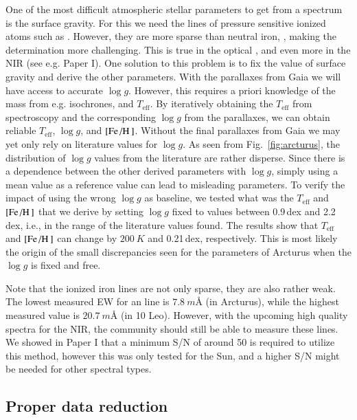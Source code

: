 \documentclass{aa}
\begin{document}
One of the most difficult atmospheric stellar parameters to get from a spectrum
is the surface gravity. For this we need the lines of pressure sensitive ionized
atoms such as . However, they are more sparse than neutral iron,
, making the determination more challenging. This is true in the
optical \citep[see e.g. the discussion by][]{Mortier2013c}, and even more in the
NIR (see e.g. Paper I). One solution to this problem is to fix the value of
surface gravity and derive the other parameters. With the parallaxes from Gaia
\citep{GAIA} we will have access to accurate $\log g$. However, this requires a
priori knowledge of the mass from e.g. isochrones, and $T_\mathrm{eff}$. By
iteratively obtaining the $T_\mathrm{eff}$ from spectroscopy and the
corresponding $\log g$ from the parallaxes, we can obtain reliable
$T_\mathrm{eff}$, $\log g$, and $[\ion{Fe}/\ion{H}]$. Without the final
parallaxes from Gaia we may yet only rely on literature values for $\log g$. As
seen from Fig.~\ref{fig:arcturus}, the distribution of $\log g$ values from the
literature are rather disperse. Since there is a dependence between the other
derived parameters with $\log g$, simply using a mean value as a reference value
can lead to misleading parameters. To verify the impact of using the wrong $\log
g$ as baseline, we tested what was the $T_\mathrm{eff}$ and $[\ion{Fe}/\ion{H}]$
that we derive by setting $\log g$ fixed to values between 0.9\,dex and
2.2\,dex, i.e., in the range of the literature values found. The results show
that $T_\mathrm{eff}$ and $[\ion{Fe}/\ion{H}]$ can change by $\SI{200}{K}$ and
0.21\,dex, respectively. This is most likely the origin of the small
discrepancies seen for the parameters of Arcturus when the $\log g$ is fixed and
free.

Note that the ionized iron lines are not only sparse, they are also rather weak.
The lowest measured EW for an  line is $\SI{7.8}{m}$\AA{} (in
Arcturus), while the highest measured value is $\SI{20.7}{m}$\AA{} (in 10 Leo).
However, with the upcoming high quality spectra for the NIR, the community
should still be able to measure these  lines. We showed in Paper I
that a minimum S/N of around 50 is required to utilize this method, however this
was only tested for the Sun, and a higher S/N might be needed for other spectral
types.


\subsection{Proper data reduction}
\end{document}
